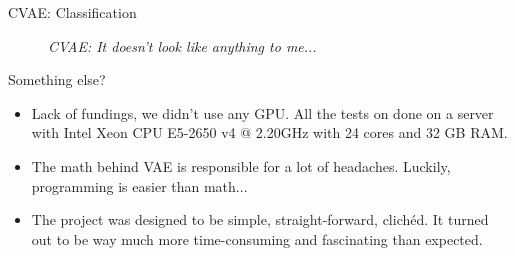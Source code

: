 \documentclass[11pt]{beamer} %
\begin{document}
\begin{frame}[allowframebreaks]{CVAE: Classification}
\begin{figure}[htbp]
\textit{CVAE: It doesn't look like anything to me...}
\end{figure}

\end{frame}

\begin{frame}{Something else?}

\begin{itemize}
    \item Lack of fundings, we didn't use any GPU. All the tests on done on a server with Intel Xeon CPU E5-2650 v4 @ 2.20GHz with 24 cores and 32 GB RAM.
    \item The math behind VAE is responsible for a lot of headaches. Luckily, programming is easier than math...
    \item The project was designed to be simple, straight-forward, clichéd. It turned out to be way much more time-consuming and fascinating than expected.
\end{itemize}
    
\end{frame}
\end{document}
